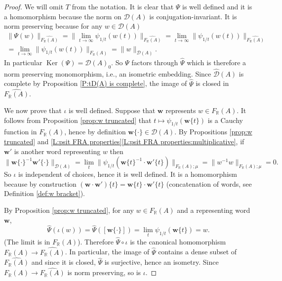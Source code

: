 \documentclass[12pt]{amsart}
\theoremstyle{definition}
\def\RR{\ensuremath{\mathbb{R}}}
\newcommand{\B}[1]{\mathbf{#1}}
\newcommand{\C}[1]{\mathcal{#1}}
\newcommand{\OP}[1]{\operatorname{#1}}
\newcommand{\trc}[1]{\{ #1 \}}   %
\def\Free{F}
\def\D{\mathcal{D}}
\def\tD{\hat{\D}}
\begin{document}
\begin{proof}
We will omit $T$ from the notation.
It is clear that $\Psi$ is well defined and it is a homomorphism because the norm on $\C D(A)$ is conjugation-invariant.
It is norm preserving because for any  $w \in \C D(A)$ 
 \begin{multline*}
\| \Psi(w)\|_{\widehat{\Free_\RR(A)}} = \| \lim_{t\to \infty} \psi_{1/t}(w(t))\|_{\widehat{\Free_\RR(A)}} =
\lim_{t\to \infty} \|  \psi_{1/t}(w(t))\|_{\widehat{\Free_\RR(A)}} 
\\
=
\lim_{t\to \infty} \|  \psi_{1/t}(w(t))\|_{\Free_\RR(A)} =
\|w\|_{\C D(A)}.
\end{multline*}
In particular $\OP{Ker}(\Psi)=\C D(A)_0$.
So $\Psi$ factors through $\hat{\Psi}$ which is therefore a norm preserving monomorphism, i.e., an isometric embedding.
Since $\tD(A)$ is complete by Proposition \ref{P:tD(A) is complete}, the image of $\hat{\Psi}$ is closed in $\widehat{\Free_\RR(A)}$.

We now prove that $\iota$ is well defined.
Suppose that $\B w$ represents $w \in \Free_\RR(A)$.
It follows from Proposition \ref{prop:w truncated} that $t \mapsto \psi_{1/t}(\B w\trc{t})$ is a Cauchy function in $\Free_\RR(A)$, hence by definition $\B w\trc{\cdot} \in \C D(A)$.
By Propositions \ref{prop:w truncated} and \ref{L:psit FRA properties}\ref{L:psit FRA properties:multiplicative}, if $\B w'$ is another word representing $w$ then 
\[
\| \B w\trc{\cdot}^{-1} \B w'\trc{\cdot}\|_{\C D(A)} =
\lim_t \| \psi_{1/t}(\B w\trc{t}^{-1} \cdot \B w'\trc{t})\|_{\Free_\RR(A);\mu} =
\| w^{-1} w \|_{\Free_\RR(A);\mu} =0.
\]
So $\iota$ is independent of choices, hence it is well defined.
It is a homomorphism because by construction $(\B w \cdot \B w')\trc{t}=\B w\trc{t} \cdot \B w'\trc{t}$ (concatenation of words, see Definition \ref{def:w bracket}).

By Proposition \ref{prop:w truncated}, for any $w \in \Free_\RR(A)$ and a representing word $\B w$,
\[
\hat{\Psi}(\iota(w)) = \hat{\Psi}([\B w\trc{\cdot}]) = \lim_t \psi_{1/t}(\B w\trc{t}) = w.
\]
(The limit is in $\Free_\RR(A)$).
Therefore $\hat{\Psi} \circ \iota$ is the canonical homomorphism $\Free_\RR(A) \to \widehat{\Free_\RR(A)}$.
In particular, the image of $\hat{\Psi}$ contains a dense subset of $\widehat{\Free_\RR(A)}$ and since it is closed, $\hat{\Psi}$ is surjective, hence an isometry.
Since $\Free_\RR(A) \to \widehat{\Free_\RR(A)}$ is norm preserving, so is $\iota$.
\end{proof}
\end{document}
